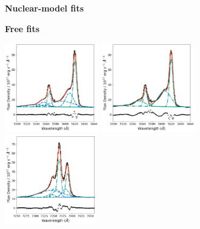 \begin{figure}\ContinuedFloat
    \centering
    \begin{subfigure}[t]{0.9\linewidth}
        \begin{minipage}{0.48\linewidth}
            \centering
            \textbf{Nuclear-model fits}
        \end{minipage}
        \hfill
        \begin{minipage}{0.42\linewidth}
            \centering
            \textbf{Free fits}
        \end{minipage}
        \vfill
        \includegraphics[width=0.45\textwidth]{figures/muse_f13451_1232/line_fits/ap3_oiii.png}
        \hfill
        \includegraphics[width=0.45\textwidth]{figures/muse_f13451_1232/line_fits/ap3_oiii_no_nuclear_model.png}
        \vfill
        \includegraphics[width=0.435\textwidth]{figures/muse_f13451_1232/line_fits/ap3_halpha.png}

\end{subfigure}
\end{figure}
